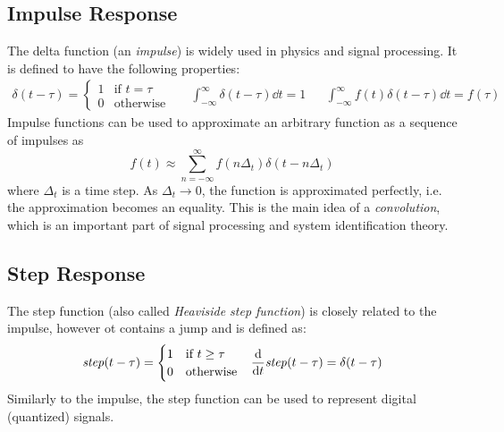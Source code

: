 		\subsection{Impulse Response}
			The delta function (an \emph{impulse}) is widely used in physics and signal processing. It is defined to have the following properties:
			\begin{align*}
				\delta(t - \tau) =
				\begin{cases}
					1 & \text{if } t = \tau \\
					0 & \text{otherwise}
				\end{cases}
				 &  &
				\int_{-\infty}^{\infty} \! \delta(t - \tau) \dd{t} = 1
				 &  &
				\int_{-\infty}^{\infty} \! f(t) \delta(t - \tau) \dd{t} = f(\tau)
			\end{align*}
			Impulse functions can be used to approximate an arbitrary function as a sequence of impulses as
			\begin{equation*}
				f(t) \approx \sum_{n = -\infty}^{\infty} f(n\Delta_t) \delta(t - n\Delta_t)
			\end{equation*}
			where \(\Delta_t\) is a time step. As \(\Delta_t \to 0\), the function is approximated perfectly, i.e. the approximation becomes an equality. This is the main idea of a \emph{convolution}, which is an important part of signal processing and system identification theory.

		\subsection{Step Response}
			The step function (also called \emph{Heaviside step function}) is closely related to the impulse, however ot contains a jump and is defined as:
			\begin{align*}
				\mathit{step}(t - \tau) =
				\begin{cases}
					1 & \text{if } t \geq \tau \\
					0 & \text{otherwise}
				\end{cases}
				 &  &
				\dv{t} \mathit{step}(t - \tau) = \delta(t - \tau)
			\end{align*}
			Similarly to the impulse, the step function can be used to represent digital (quantized) signals.

